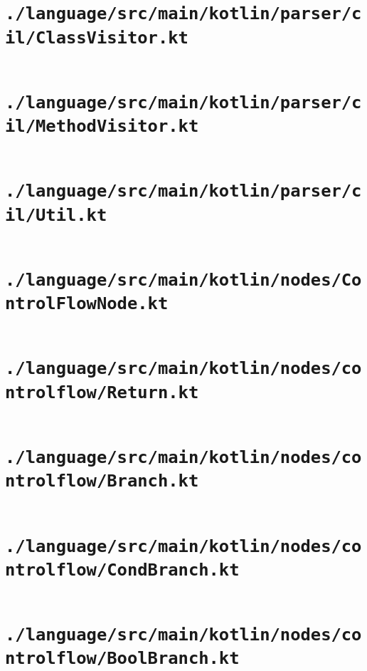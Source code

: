 \documentclass[a4paper, 11pt]{report}
\begin{document}
    \section{\lstinline{./language/src/main/kotlin/parser/cil/ClassVisitor.kt}}
    \inputminted{kotlin}{./language/src/main/kotlin/parser/cil/ClassVisitor.kt}


    \section{\lstinline{./language/src/main/kotlin/parser/cil/MethodVisitor.kt}}
    \inputminted{kotlin}{./language/src/main/kotlin/parser/cil/MethodVisitor.kt}


    \section{\lstinline{./language/src/main/kotlin/parser/cil/Util.kt}}
    \inputminted{kotlin}{./language/src/main/kotlin/parser/cil/Util.kt}


    \section{\lstinline{./language/src/main/kotlin/nodes/ControlFlowNode.kt}}
    \inputminted{kotlin}{./language/src/main/kotlin/nodes/ControlFlowNode.kt}


    \section{\lstinline{./language/src/main/kotlin/nodes/controlflow/Return.kt}}
    \inputminted{kotlin}{./language/src/main/kotlin/nodes/controlflow/Return.kt}


    \section{\lstinline{./language/src/main/kotlin/nodes/controlflow/Branch.kt}}
    \inputminted{kotlin}{./language/src/main/kotlin/nodes/controlflow/Branch.kt}


    \section{\lstinline{./language/src/main/kotlin/nodes/controlflow/CondBranch.kt}}
    \inputminted{kotlin}{./language/src/main/kotlin/nodes/controlflow/CondBranch.kt}


    \section{\lstinline{./language/src/main/kotlin/nodes/controlflow/BoolBranch.kt}}
    \inputminted{kotlin}{./language/src/main/kotlin/nodes/controlflow/BoolBranch.kt}
\end{document}
